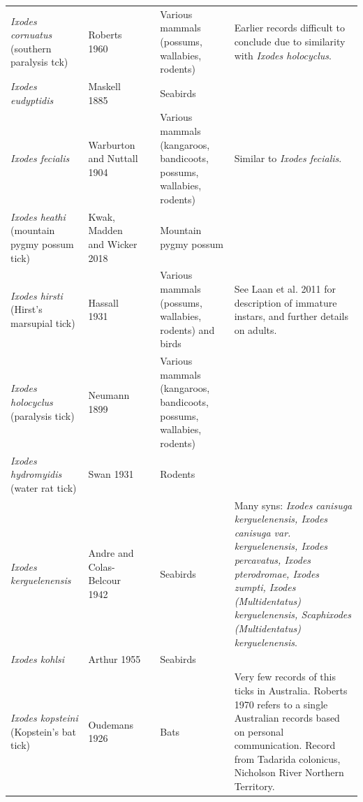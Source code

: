 \documentclass[a4paper, nobind]{templates/ociamthesis}
\begin{document}
\begin{landscape}
\begin{longtable}[t]{>{\raggedright\arraybackslash}p{4cm}>{\raggedright\arraybackslash}p{3cm}>{\raggedright\arraybackslash}p{1cm}>{\raggedright\arraybackslash}p{4cm}>{\raggedright\arraybackslash}p{6cm}}
\textit{Ixodes cornuatus} (southern paralysis tck) & Roberts 1960 & \multicolumn{1}{c}{\cellcolor[HTML]{8DD3C7}{\textcolor{white}{Y}}} & Various mammals (possums, wallabies, rodents) & Earlier records difficult to conclude due to similarity with \textit{Ixodes holocyclus}.\\
\textit{Ixodes eudyptidis} & Maskell 1885 & \multicolumn{1}{c}{\cellcolor[HTML]{BEBADA}{\textcolor{white}{N}}} & Seabirds & \\
\textit{Ixodes fecialis} & Warburton and Nuttall 1904 & \multicolumn{1}{c}{\cellcolor[HTML]{8DD3C7}{\textcolor{white}{Y}}} & Various mammals (kangaroos, bandicoots, possums, wallabies, rodents) & Similar to \textit{Ixodes fecialis}.\\
\textit{Ixodes heathi} (mountain pygmy possum tick) & Kwak, Madden and Wicker 2018 & \multicolumn{1}{c}{\cellcolor[HTML]{BEBADA}{\textcolor{white}{N}}} & Mountain pygmy possum & \\
\textit{Ixodes hirsti} (Hirst's marsupial tick) & Hassall 1931 & \multicolumn{1}{c}{\cellcolor[HTML]{8DD3C7}{\textcolor{white}{Y}}} & Various mammals (possums, wallabies, rodents) and birds & See Laan et al. 2011 for description of immature instars, and further details on adults.\\
\textit{Ixodes holocyclus} (paralysis tick) & Neumann 1899 & \multicolumn{1}{c}{\cellcolor[HTML]{8DD3C7}{\textcolor{white}{Y}}} & Various mammals (kangaroos, bandicoots, possums, wallabies, rodents) & \\
\textit{Ixodes hydromyidis} (water rat tick) & Swan 1931 & \multicolumn{1}{c}{\cellcolor[HTML]{BEBADA}{\textcolor{white}{N}}} & Rodents & \\
\textit{Ixodes kerguelenensis} & Andre and Colas-Belcour 1942 & \multicolumn{1}{c}{\cellcolor[HTML]{BEBADA}{\textcolor{white}{N}}} & Seabirds & Many syns: \textit{Ixodes canisuga kerguelenensis, Ixodes canisuga var. kerguelenensis, Ixodes percavatus, Ixodes pterodromae, Ixodes zumpti, Ixodes (Multidentatus) kerguelenensis, Scaphixodes (Multidentatus) kerguelenensis}.\\
\textit{Ixodes kohlsi} & Arthur 1955 & \multicolumn{1}{c}{\cellcolor[HTML]{8DD3C7}{\textcolor{white}{Y}}} & Seabirds & \\
\textit{Ixodes kopsteini} (Kopstein's bat tick) & Oudemans 1926 & \multicolumn{1}{c}{\cellcolor[HTML]{BEBADA}{\textcolor{white}{N}}} & Bats & Very few records of this ticks in Australia. Roberts 1970 refers to a single Australian records based on personal communication. Record from Tadarida colonicus, Nicholson River Northern Territory.\\

\end{longtable}
\end{landscape}
\end{document}
